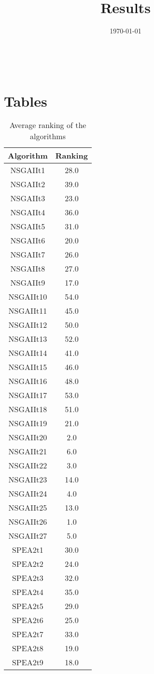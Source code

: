 \documentclass{article}
\title{Results}
\author{}
\date{\today}
\begin{document}
\oddsidemargin 0in \topmargin 0in\maketitle
\
\section{Tables}
\begin{table}[!htp]
\centering
\caption{Average ranking of the algorithms}
\begin{tabular}{c|c}
Algorithm&Ranking\\
\hline
NSGAIIt1&28.0\\
NSGAIIt2&39.0\\
NSGAIIt3&23.0\\
NSGAIIt4&36.0\\
NSGAIIt5&31.0\\
NSGAIIt6&20.0\\
NSGAIIt7&26.0\\
NSGAIIt8&27.0\\
NSGAIIt9&17.0\\
NSGAIIt10&54.0\\
NSGAIIt11&45.0\\
NSGAIIt12&50.0\\
NSGAIIt13&52.0\\
NSGAIIt14&41.0\\
NSGAIIt15&46.0\\
NSGAIIt16&48.0\\
NSGAIIt17&53.0\\
NSGAIIt18&51.0\\
NSGAIIt19&21.0\\
NSGAIIt20&2.0\\
NSGAIIt21&6.0\\
NSGAIIt22&3.0\\
NSGAIIt23&14.0\\
NSGAIIt24&4.0\\
NSGAIIt25&13.0\\
NSGAIIt26&1.0\\
NSGAIIt27&5.0\\
SPEA2t1&30.0\\
SPEA2t2&24.0\\
SPEA2t3&32.0\\
SPEA2t4&35.0\\
SPEA2t5&29.0\\
SPEA2t6&25.0\\
SPEA2t7&33.0\\
SPEA2t8&19.0\\
SPEA2t9&18.0\\

\end{tabular}
\end{table}
\end{document}
